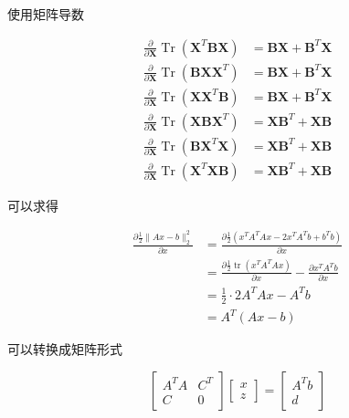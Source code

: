 \begin{remark}
    使用矩阵导数

    $$ \begin{aligned} \frac{\partial}{\partial \mathbf{X}} \operatorname{Tr}\left(\mathbf{X}^{T} \mathbf{B X}\right) &=\mathbf{B X}+\mathbf{B}^{T} \mathbf{X} \\ \frac{\partial}{\partial \mathbf{X}} \operatorname{Tr}\left(\mathbf{B X X}^{T}\right) &=\mathbf{B X}+\mathbf{B}^{T} \mathbf{X} \\ \frac{\partial}{\partial \mathbf{X}} \operatorname{Tr}\left(\mathbf{X X}^{T} \mathbf{B}\right) &=\mathbf{B X}+\mathbf{B}^{T} \mathbf{X} \\ \frac{\partial}{\partial \mathbf{X}} \operatorname{Tr}\left(\mathbf{X B X}^{T}\right) &=\mathbf{X B}^{T}+\mathbf{X B} \\ \frac{\partial}{\partial \mathbf{X}} \operatorname{Tr}\left(\mathbf{B X}^{T} \mathbf{X}\right) &=\mathbf{X B}^{T}+\mathbf{X B} \\ \frac{\partial}{\partial \mathbf{X}} \operatorname{Tr}\left(\mathbf{X}^{T} \mathbf{X B}\right) &=\mathbf{X B}^{T}+\mathbf{X B} \end{aligned} $$

    可以求得

    $$\begin{aligned}
        \frac{\partial \frac{1}{2} \| Ax-b\| _{2}^{2}}{\partial x} & =\frac{\partial \frac{1}{2}\left( x^{T} A^{T} Ax-2x^{T} A^{T} b+b^{T} b\right)}{\partial x}\\
         & =\frac{\partial \frac{1}{2}\operatorname{tr}\left( x^{T} A^{T} Ax\right)}{\partial x} -\frac{\partial x^{T} A^{T} b}{\partial x}\\
         & =\frac{1}{2} \cdotp 2A^{T} Ax-A^{T} b\\
         & =A^{T}( Ax-b)
        \end{aligned}$$
\end{remark}

可以转换成矩阵形式

$$ \left[\begin{array}{cc}A^{T} A & C^{T} \\ {C} & 0\end{array}\right]\left[\begin{array}{l}x \\ z\end{array}\right]=\left[\begin{array}{l}A^{T} b \\ d\end{array}\right] $$

